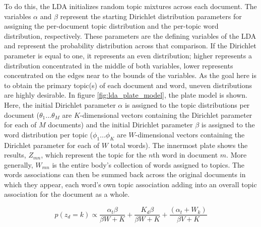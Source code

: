 \documentclass[conference]{IEEEtran}
\begin{document}
To do this, the LDA initializes random topic mixtures across each document. The variables $\alpha$ and $\beta$ represent the starting Dirichlet distribution parameters for assigning the per-document topic distribution and the per-topic word distribution, respectively. These parameters are the defining variables of the LDA and represent the probability distribution across that comparison. If the Dirichlet parameter is equal to one, it represents an even distribution; higher represents a distribution concentrated in the middle of both variables, lower represents concentrated on the edges near to the bounds of the variables. As the goal here is to obtain the primary topic(s) of each document and word, uneven distributions are highly desirable. In figure \ref{fig:lda_plate_model}, the plate model is shown. Here, the initial Dirichlet parameter $\alpha$ is assigned to the topic distributions per document ($\theta_1 ... \theta_M$  are $K$-dimensional vectors containing the Dirichlet parameter for each of $M$ documents) and the initial Dirichlet parameter $\beta$ is assigned to the word distribution per topic ($\phi_1 ... \phi_K$  are $W$-dimensional vectors containing the Dirichlet parameter for each of $W$ total words). The innermost plate shows the results, $Z_{mn}$, which represent the topic for the $n$th word in document $m$. More generally, $W_{mn}$ is the entire body's collection of words assigned to topics. The words associations can then be summed back across the original documents in which they appear, each word's own topic association adding into an overall topic association for the document as a whole.

\begin{equation}
\label{eq:gibbs_samp}
p(z_d = k) \propto \frac{\alpha_t\beta}{\beta W + K} + \frac{K_{d}\beta}{\beta W + K} + \frac{(\alpha_t + W_{k})}{\beta V + K}
\end{equation}
	
\end{document}
